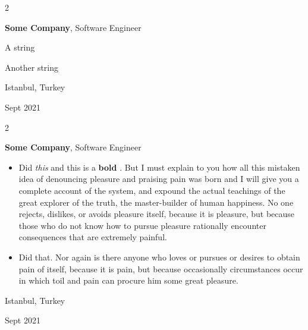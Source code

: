\documentclass[10pt, letterpaper]{article}
\newenvironment{summary}{
    \begin{description}[
        topsep=0.10 cm,
        parsep=0.10 cm,
        partopsep=0pt,
        itemsep=0pt,
        leftmargin=0.4 cm + 10pt
    ]
}{
    \end{description}
} %
\newenvironment{highlights}{
    \begin{itemize}[
        topsep=0.10 cm,
        parsep=0.10 cm,
        partopsep=0pt,
        itemsep=0pt,
        leftmargin=0.4 cm + 10pt
    ]
}{
    \end{itemize}
} %
\newenvironment{twocolentry}[2][]{
    \onecolentry
    \def\secondColumn{#2}
    \setcolumnwidth{\fill, 4.5 cm}
    \begin{paracol}{2}
}{
    \switchcolumn \raggedleft \secondColumn
    \end{paracol}
    \endonecolentry
} %
\let\hrefWithoutArrow\href
\renewcommand{\href}[2]{\hrefWithoutArrow{#1}{\ifthenelse{\equal{#2}{}}{ }{#2 }\raisebox{.15ex}{\footnotesize \faExternalLink*}}}
\begin{document}
        \vspace{0.2 cm}

        \begin{twocolentry}{
            Istanbul, Turkey

        Sept 2021
        }
            \textbf{Some \textnormal{Company}}, Software Engineer
            \begin{summary}
                \item A string
                \item Another string
            \end{summary}
        \end{twocolentry}


        \vspace{0.2 cm}

        \begin{twocolentry}{
            Istanbul, Turkey

        Sept 2021
        }
            \textbf{Some \textnormal{Company}}, Software Engineer
            \begin{highlights}
                \item Did \textit{this} and this is a \textbf{bold} \href{https://example.com}{link}. But I must explain to you how all this mistaken idea of denouncing pleasure and praising pain was born and I will give you a complete account of the system, and expound the actual teachings of the great explorer of the truth, the master-builder of human happiness. No one rejects, dislikes, or avoids pleasure itself, because it is pleasure, but because those who do not know how to pursue pleasure rationally encounter consequences that are extremely painful.
                \item Did that. Nor again is there anyone who loves or pursues or desires to obtain pain of itself, because it is pain, but because occasionally circumstances occur in which toil and pain can procure him some great pleasure.
            \end{highlights}
        \end{twocolentry}


        \vspace{0.2 cm}
\end{document}
